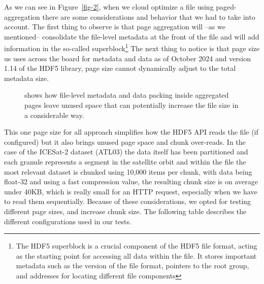 \documentclass[
]{agujournal2019}
\begin{document}
As we can see in Figure~\ref{fig-2}, when we cloud optimize a file using
paged-aggregation there are some considerations and behavior that we had
to take into account. The first thing to observe is that page
aggregation will --as we mentioned-- consolidate the file-level metadata
at the front of the file and will add information in the so-called
superblock\footnote{The HDF5 superblock is a crucial component of the
  HDF5 file format, acting as the starting point for accessing all data
  within the file. It stores important metadata such as the version of
  the file format, pointers to the root group, and addresses for
  locating different file components} The next thing to notice is that
page size us uses across the board for metadata and data as of October
2024 and version 1.14 of the HDF5 library, page size cannot dynamically
adjust to the total metadata size.

\begin{figure}


\caption{\label{fig-3}shows how file-level metadata and data packing
inside aggregated pages leave unused space that can potentially increase
the file size in a considerable way.}

\end{figure}%

This one page size for all approach simplifies how the HDF5 API reads
the file (if configured) but it also brings unused page space and chunk
over-reads. In the case of the ICESat-2 dataset (ATL03) the data itself
has been partitioned and each granule represents a segment in the
satellite orbit and within the file the most relevant dataset is chunked
using 10,000 items per chunk, with data being float-32 and using a fast
compression value, the resulting chunk size is on average under 40KB,
which is really small for an HTTP request, especially when we have to
read them sequentially. Because of these considerations, we opted for
testing different page sizes, and increase chunk size. The following
table describes the different configurations used in our tests.
\end{document}
